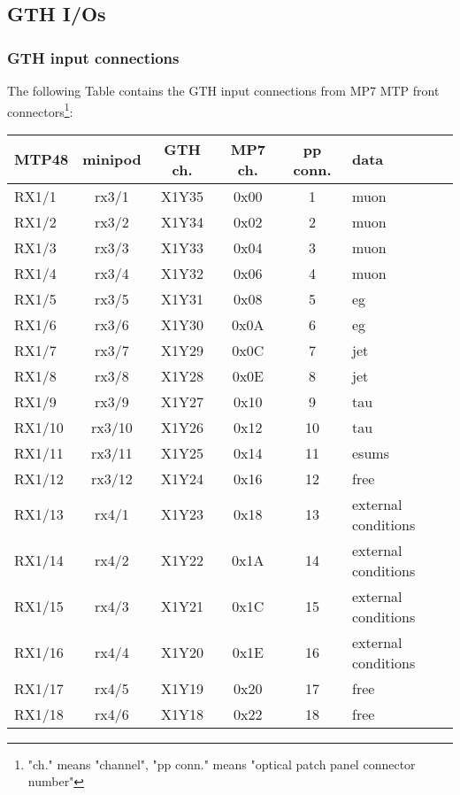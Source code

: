 \clearpage
\subsection{GTH I/Os}\label{sec:app:gth_io}

\subsubsection{GTH input connections}\label{sec:app:gth_i_conn}

The following Table contains the GTH input connections from MP7 MTP front connectors\footnote{"ch." means "channel", "pp conn." means "optical patch panel connector number"}:

\begin{longtable}{|l|c|c|c|c|l|}
\hline
\textbf{MTP48}& \textbf{minipod}& \textbf{GTH ch.}& \textbf{MP7 ch.} &\textbf{pp conn.}& \textbf{data}\\
\hline
\hline
\endhead
RX1/1  & rx3/1  & X1Y35 & 0x00 & 1  & muon\\\hline
RX1/2  & rx3/2  & X1Y34 & 0x02 & 2  & muon\\\hline
RX1/3  & rx3/3  & X1Y33 & 0x04 & 3  & muon\\\hline
RX1/4  & rx3/4  & X1Y32 & 0x06 & 4  & muon\\\hline
RX1/5  & rx3/5  & X1Y31 & 0x08 & 5  & eg\\\hline
RX1/6  & rx3/6  & X1Y30 & 0x0A & 6  & eg\\\hline
RX1/7  & rx3/7  & X1Y29 & 0x0C & 7  & jet\\\hline
RX1/8  & rx3/8  & X1Y28 & 0x0E & 8  & jet\\\hline
RX1/9  & rx3/9  & X1Y27 & 0x10 & 9  & tau\\\hline
RX1/10 & rx3/10 & X1Y26 & 0x12 & 10 & tau\\\hline
RX1/11 & rx3/11 & X1Y25 & 0x14 & 11 & esums\\\hline
RX1/12 & rx3/12 & X1Y24 & 0x16 & 12 & free\\\hline
RX1/13 & rx4/1  & X1Y23 & 0x18 & 13 & external conditions\\\hline
RX1/14 & rx4/2  & X1Y22 & 0x1A & 14 & external conditions\\\hline
RX1/15 & rx4/3  & X1Y21 & 0x1C & 15 & external conditions\\\hline
RX1/16 & rx4/4  & X1Y20 & 0x1E & 16 & external conditions\\\hline
RX1/17 & rx4/5  & X1Y19 & 0x20 & 17 & free\\\hline
RX1/18 & rx4/6  & X1Y18 & 0x22 & 18 & free\\\hline

\end{longtable}
